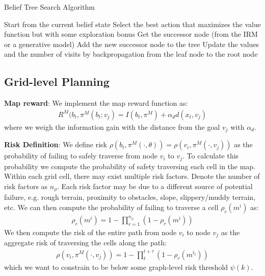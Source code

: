 \documentclass{article}
\newcommand{\ph}[1]{{\textbf{#1}:}} %
\begin{document}
\begin{algorithm}[t!]
\caption{Belief Tree Search Algorithm}
\label{alg:pomcp}
\begin{algorithmic} 
  \STATE Start from the current belief state
      \STATE Select the best action that maximizes the value function but with some exploration bonus
      \STATE Get the successor node (from the IRM or a generative model)
      \STATE Add the new successor node to the tree
    \ENDWHILE
    \STATE Update the values and the number of visits by backpropagation from the leaf node to the root node
  \ENDWHILE
\end{algorithmic}
\end{algorithm}



\subsection{Grid-level Planning}

\ph{Map reward}
We implement the map reward function as:
\begin{align}
    R^M(b_t, \pi^M(b_t;v_j) = I(b_t,\pi^M) + \alpha_d d(x_t,v_j)
\end{align}
where we weigh the information gain with the distance from the goal $v_j$ with $\alpha_d$.

\ph{Risk Definition}
We define risk  $\rho(b_t,\pi^M(\cdot,\theta)) = \rho(v_i,\pi^M(\cdot,v_j))$ as the probability of failing to safely traverse from node $v_i$ to $v_j$.  To calculate this probability we compute the probability of safety traversing each cell in the map.  Within each grid cell, there may exist multiple risk factors.  Denote the number of risk factors as $n_\rho$.  Each risk factor may be due to a different source of potential failure, e.g. rough terrain, proximity to obstacles, slope, slippery/muddy terrain, etc.  We can then compute the probability of failing to traverse a cell $\rho_c(m^i)$ as:
\begin{align}
    \rho_c(m^i) = 1-\prod_{r=1}^{n_\rho} (1-\rho_r(m^i))
\end{align}
We then compute the risk of the entire path from node $v_i$ to node $v_j$ as the aggregate risk of traversing the cells along the path:
\begin{align}
    \rho(v_i,\pi^M(\cdot,v_j))=1-\prod_t^{t+\tau}(1-\rho_c(m^{i_t}))
\end{align}
which we want to constrain to be below some graph-level risk threshold $\psi(k)$.
\end{document}
